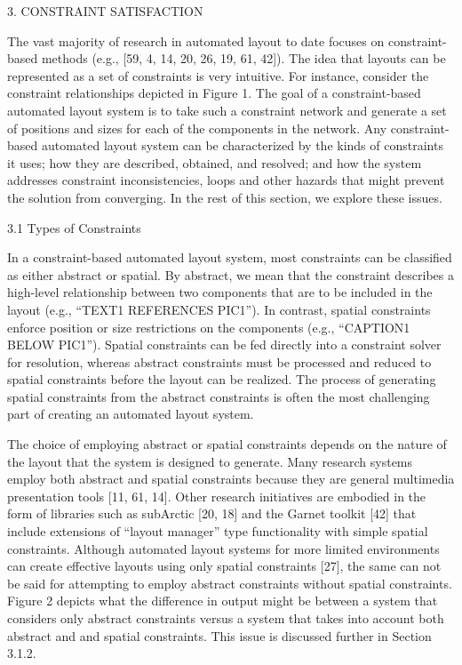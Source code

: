     3. CONSTRAINT SATISFACTION

    The vast majority of research in automated layout to date focuses on constraint-based methods (e.g., [59, 4, 14, 20, 26, 19, 61, 42]). The idea that layouts can be represented as a set of constraints is very intuitive. For instance, consider the constraint relationships depicted in Figure 1. The goal of a constraint-based automated layout system is to take such a constraint network and generate a set of positions and sizes for each of the components in the network. Any constraint-based automated layout system can be characterized by the kinds of constraints it uses; how they are described, obtained, and resolved; and how the system addresses constraint inconsistencies, loops and other hazards that might prevent the solution from converging. In the rest of this section, we explore these issues.

    3.1 Types of Constraints

    In a constraint-based automated layout system, most constraints can be classified as either abstract or spatial. By abstract, we mean that the constraint describes a high-level relationship between two components that are to be included in the layout (e.g., “TEXT1 REFERENCES PIC1”). In contrast, spatial constraints enforce position or size restrictions on the components (e.g., “CAPTION1 BELOW PIC1”). Spatial constraints can be fed directly into a constraint solver for resolution, whereas abstract constraints must be processed and reduced to spatial constraints before the layout can be realized. The process of generating spatial constraints from the abstract constraints is often the most challenging part of creating an automated layout system.

    The choice of employing abstract or spatial constraints depends on the nature of the layout that the system is designed to generate. Many research systems employ both abstract and spatial constraints because they are general multimedia presentation tools [11, 61, 14]. Other research initiatives are embodied in the form of libraries such as subArctic [20, 18] and the Garnet toolkit [42] that include extensions of “layout manager” type functionality with simple spatial constraints. Although automated layout systems for more limited environments can create effective layouts using only spatial constraints [27], the same can not be said for attempting to employ abstract constraints without spatial constraints. Figure 2 depicts what the difference in output might be between a system that considers only abstract constraints versus a system that takes into account both abstract and and spatial constraints. This issue is discussed further in Section 3.1.2.

